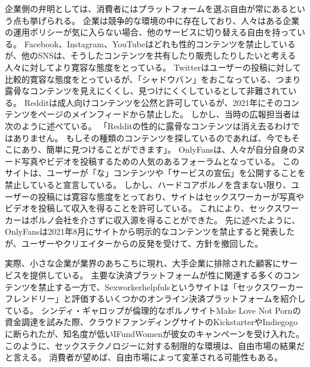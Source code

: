 \documentclass[paper=a4,book,openany]{jlreq}
\begin{document}
企業側の弁明としては、消費者にはプラットフォームを選ぶ自由が常にあるという点も挙げられる。
企業は競争的な環境の中に存在しており、人々はある企業の運用ポリシーが気に入らない場合、他のサービスに切り替える自由を持っている。
Facebook、Instagram、YouTubeはどれも性的コンテンツを禁止しているが、他のSNSは、そうしたコンテンツを共有したり販売したりしたいと考える人々に対してより寛容な態度をとっている。
Twitterはユーザーの投稿に対して比較的寛容な態度をとっているが、「シャドウバン」をおこなっている、つまり露骨なコンテンツを見えにくくし、見つけにくくしているとして非難されている\citep{valens20:_repor_says_shadow_is_real}。
Redditは成人向けコンテンツを公然と許可しているが、2021年にそのコンテンツをページのメインフィードから禁止した。
しかし、当時の広報担当者は次のように述べている。
「Redditの性的に露骨なコンテンツは消え去るわけではありません。
もしその種類のコンテンツを探しているのであれば、今でもそこにあり、簡単に見つけることができます」\citep{sosa11:_remov_sexual_explic_conten}。
OnlyFansは、人々が自分自身のヌード写真やビデオを投稿するための人気のあるフォーラムとなっている。
このサイトは、ユーザーが「な」コンテンツや「サービスの宣伝」を公開することを禁止していると宣言している。
しかし、ハードコアポルノを含まない限り、ユーザーの投稿には寛容な態度をとっており、サイトはセックスワーカーが写真やビデオを投稿して収入を得ることを許可している。
これにより、セックスワーカーはポルノ会社を介さずに収入源を得ることができた\citep{bernstein19:_how_onlyf_chang_sex_work_forev}。
先に述べたように、OnlyFansは2021年8月にサイトから明示的なコンテンツを禁止すると発表したが、ユーザーやクリエイターからの反発を受けて、方針を撤回した。

実際、小さな企業が業界のあちこちに現れ、大手企業に排除された顧客にサービスを提供している。
主要な決済プラットフォームが性に関連する多くのコンテンツを禁止する一方で、Sexworkerhelpfulsというサイトは「セックスワーカーフレンドリー」と評価するいくつかのオンライン決済プラットフォームを紹介している\citep{sexworkerhelpfuls.com18:_sex_work_approv_paymen_option}。
シンディ・ギャロップが倫理的なポルノサイトMake Love Not Pornの資金調達を試みた際、クラウドファンディングサイトのKickstarterやIndiegogoに断られたが、知名度が低いIFundWomenが彼女のキャンペーンを受け入れた\citep{gardezi16:_cindy_gallop_journ_normal_dialog_aroun_sex}。
このように、セックステクノロジーに対する制限的な環境は、自由市場の結果だと言える。
消費者が望めば、自由市場によって変革される可能性もある。
\end{document}
